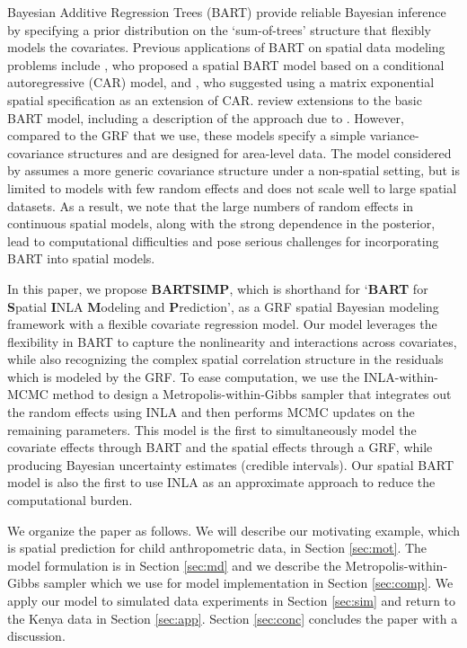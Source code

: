 \documentclass[preprint,12pt,authoryear]{elsarticle}
\begin{document}
Bayesian Additive Regression Trees (BART) \citep{chipman2010bart} provide reliable Bayesian inference by specifying a prior distribution on the `sum-of-trees' structure that flexibly models the covariates. Previous applications of BART on spatial data modeling problems include \cite{muller2007spatially}, who proposed a spatial BART model based on a conditional autoregressive (CAR) model, and \cite{Krueger2020}, who suggested using a matrix exponential spatial specification \citep{lesage2007matrix} as an extension of CAR.  \cite{tan2019bayesian} review extensions to the basic BART  model, including a description of the approach due to \cite{muller2007spatially}.  However, compared to the GRF that we use, these models specify a simple variance-covariance structures and are designed for area-level data. The model considered by \cite{spanbauer2021nonparametric} assumes a more generic covariance structure under a non-spatial setting, but is limited to models with few random effects and does not scale well to large spatial datasets. As a result, we note that the large numbers of random effects in continuous spatial models, along with the strong dependence in the posterior, lead to computational difficulties and pose serious challenges for incorporating BART into spatial models.  

In this paper, we propose \textbf{BARTSIMP}, which is shorthand for `\textbf{BART} for \textbf{S}patial \textbf{I}NLA \textbf{M}odeling and \textbf{P}rediction', as a GRF spatial Bayesian modeling framework with a flexible covariate regression model. Our model leverages the flexibility in BART to capture the nonlinearity and interactions across covariates, while also recognizing the complex spatial correlation structure in the residuals which is modeled by the GRF. To ease computation, we use the INLA-within-MCMC method \citep{gomez2018markov} to design a Metropolis-within-Gibbs sampler that integrates out the random effects using INLA and then performs MCMC updates on the remaining parameters. { This model is the first to simultaneously model the covariate effects through BART and the spatial effects through a GRF, while producing Bayesian uncertainty estimates (credible intervals). Our spatial BART model is also the first to use INLA as an approximate approach to reduce the computational burden.}

We organize the paper as follows. We will describe our motivating example, which is spatial prediction for child anthropometric data, in Section \ref{sec:mot}. The model formulation is in Section \ref{sec:md} and we describe the Metropolis-within-Gibbs sampler which we use for model implementation in Section \ref{sec:comp}. We apply our model to simulated data experiments in Section \ref{sec:sim} and return to the Kenya data in Section \ref{sec:app}. Section \ref{sec:conc} concludes the paper with a discussion.
\end{document}
